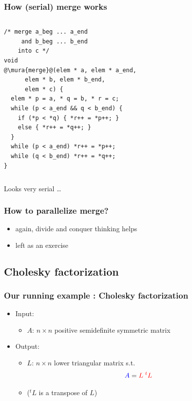 \documentclass[12pt,dvipdfmx]{beamer}
\newcommand{\mura}[1]{{\color{purple}#1}}
\newcommand{\ao}[1]{{\color{blue}#1}}
\newcommand{\aka}[1]{{\color{red}#1}}
\begin{document}
\begin{frame}[fragile]
\frametitle{How (serial) merge works}
\begin{columns}
\begin{column}{0.5\textwidth}
\begin{lstlisting}
/* merge a_beg ... a_end 
     and b_beg ... b_end 
    into c */
void 
@\mura{merge}@(elem * a, elem * a_end, 
      elem * b, elem * b_end, 
      elem * c) {
  elem * p = a, * q = b, * r = c;
  while (p < a_end && q < b_end) {
    if (*p < *q) { *r++ = *p++; }
    else { *r++ = *q++; }
  }
  while (p < a_end) *r++ = *p++;
  while (q < b_end) *r++ = *q++;
}
\end{lstlisting}
\end{column}

\begin{column}{0.5\textwidth}
\begin{center}
\def\svgwidth{\columnwidth}
\end{center}
\end{column}
\end{columns}
Looks very serial \ldots
\end{frame}


\begin{frame}
\frametitle{How to parallelize merge?}
\begin{itemize}
\item again, divide and conquer thinking helps
\item left as an exercise
\end{itemize}
\end{frame}

\subsection{Cholesky factorization}
\begin{frame}
\frametitle{Our running example : Cholesky factorization}
\begin{itemize}
\item Input: 
  \begin{itemize}
  \item \ao{$A$}: $n\times n$ positive semidefinite symmetric matrix
  \end{itemize}
\item Output: 
  \begin{itemize}
  \item \aka{$L$}: $n\times n$ lower triangular matrix s.t.
\[ \ao{A} = \aka{L \; {}^tL} \]
  \item (${}^t L$ is a transpose of $L$)
  \end{itemize}
\end{itemize}

\begin{figure}
\centering
\def\svgwidth{0.8\textwidth}
{}
\end{figure}

\end{frame}
\end{document}
